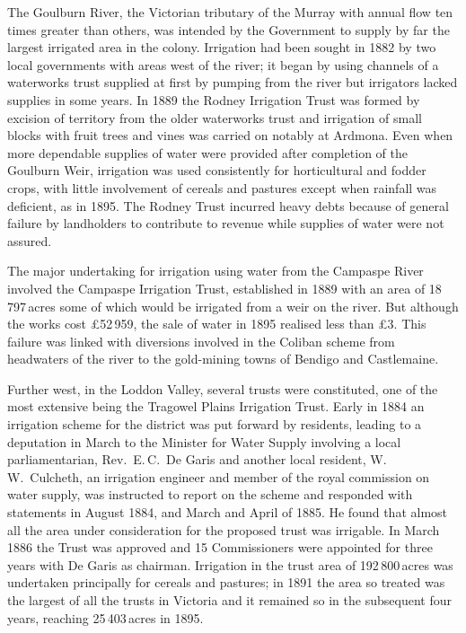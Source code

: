The Goulburn River,  the Victorian tributary of
the Murray with annual flow ten times greater than others, was
intended by the Government to supply by far the largest irrigated area
in the colony.  Irrigation had been sought in 1882 by two local
governments with areas west of the river; it began by using channels
of a waterworks trust supplied at first by pumping from the river but
irrigators lacked supplies in some years.  In 1889 the Rodney
Irrigation Trust  was formed by
excision of territory from the older waterworks trust and irrigation
of small blocks with fruit trees and vines was carried on notably at
Ardmona.  Even when more dependable supplies of water were provided
after completion of the Goulburn Weir, 
irrigation was used consistently for horticultural and fodder crops,
with little involvement of cereals and pastures except when rainfall
was deficient, as in 1895.  The Rodney Trust incurred heavy debts
because of general failure by landholders to contribute to revenue
while supplies of water were not assured.

The major undertaking for irrigation using water from the Campaspe
River involved the Campaspe Irrigation Trust,
 established in 1889 with
an area of 18\,797\,acres some of which would be irrigated from a weir on
the river.  But although the works cost \pounds52\,959, the sale of
water in 1895 realised less than \pounds3. This failure was linked
with diversions involved in the Coliban scheme from headwaters of the
river to the gold-mining towns of Bendigo and Castlemaine.

Further west, in the Loddon Valley,  several
trusts were constituted, one of the most extensive being the Tragowel
Plains Irrigation Trust. 
Early in 1884 an irrigation scheme for the district was put forward by
residents, leading to a deputation in March to the Minister for Water
Supply involving a local parliamentarian, Rev.~E.\,C.~De Garis
 and
another local resident, W.\,W.~Culcheth,  an
irrigation engineer and member of the royal commission on water
supply, was instructed to report on the scheme and responded with
statements in August 1884, and March and April of 1885.  He found that
almost all the area under consideration for the proposed trust was
irrigable.  In March 1886 the Trust was approved and 15 Commissioners
were appointed for three years with De Garis as chairman.  Irrigation
in the trust area of 192\,800\,acres was undertaken principally for
cereals and pastures; in 1891 the area so treated was the largest of
all the trusts in Victoria and it remained so in the subsequent four
years, reaching 25\,403\,acres in 1895.

